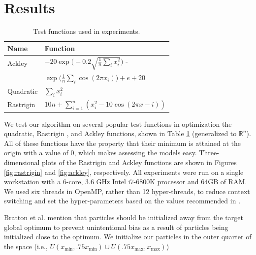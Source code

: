 \section{Results}\label{sec:results}
\begin{table}
  \centering
  \caption{Test functions used in experiments.}\label{tab:functions}
  \begin{tabular}{ll}\toprule
    \textbf{Name} & \textbf{Function}\\\midrule
    Ackley & $-20\exp\Big(-0.2\sqrt{\frac{1}{n}\sum_ix_i^2}\Big)$ -\\
    & \hspace{5mm} $\exp\Big(\frac{1}{n}\sum_i\cos(2\pi x_i)\Big) + e + 20$\\
    Quadratic & $\sum_i x_i^2$\\
    Rastrigin & $10n + \sum_{i=1}^n(x_i^2 - 10\cos(2\pi x - i))$\\\bottomrule
  \end{tabular}
\end{table}
We test our algorithm on several popular test functions in optimization
\cite{testprobs} the quadratic, Rastrigin
\cite{rastrigin}, and Ackley \cite{ackley} functions, shown in Table
\ref{tab:functions} (generalized to $\mathbb{R}^n$). All of these functions have
the property that their minimum is attained at the origin with a value of
$0$, which makes assessing the models easy. Three-dimensional plots of the
Rastrigin and Ackley functions are shown in Figures \ref{fig:rastrigin} and
\ref{fig:ackley}, respectively.
All experiments were run on a single
workstation with a 6-core, 3.6 GHz Intel i7-6800K processor and 64GB of RAM. We
used six threads in OpenMP, rather than 12 hyper-threads, to reduce context switching
and set the hyper-parameters based on the values recommended in
\cite{pso-convergence, spso}.

% 
Bratton et al. \cite{spso} mention that particles should be initialized away
from the target global optimum to prevent unintentional bias as a result of
particles being initialized close to the optimum. We initialize our particles
in the outer quarter of the space
(i.e., $  U(x_{\min}, .75x_{\min}) \cup U(.75x_{\max}, x_{\max})$)


